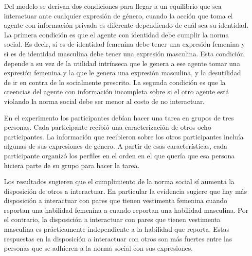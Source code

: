 Del modelo se derivan dos condiciones para llegar a un equilibrio que sea interactuar ante cualquier expresión de género, cuando la acción que toma el agente con información privada es diferente dependiendo de cuál sea su identidad. La primera condición es que el agente con identidad debe cumplir la norma social. Es decir, si es de identidad femenina debe tener una expresión femenina y si es de identidad masculina debe tener una expresión masculina. Esta condición depende a su vez de la utilidad intrínseca que le genera a ese agente tomar una expresión femenina y la que le genera una expresión masculina, y la desutilidad de ir en contra de lo socialmente prescrito. La segunda condición es que la creencias del agente con información incompleta sobre si el otro agente está violando la norma social debe ser menor al costo de no interactuar. 

En el experimento los participantes debían hacer una tarea en grupos de tres personas. Cada participante recibió una caracterización de otros ocho participantes. La información que recibieron sobre los otros participantes incluía algunas de sus expresiones de género. A partir de esas características, cada participante organizó los perfiles en el orden en el que quería que esa persona hiciera parte de su grupo para hacer la tarea. 

Los resultados sugieren que el cumplimiento de la norma social sí aumenta la disposición de otros a interactuar. En particular la evidencia sugiere que hay más disposición a interactuar con pares que tienen vestimenta femenina cuando reportan una habilidad femenina a cuando reportan una habilidad masculina. Por el contrario, la disposición a interactuar con pares que tienen vestimenta masculina es prácticamente independiente a la habilidad que reporta. Estas respuestas en la disposición a interactuar con otros son más fuertes entre las personas que se adhieren a la norma social con sus expresiones.  

